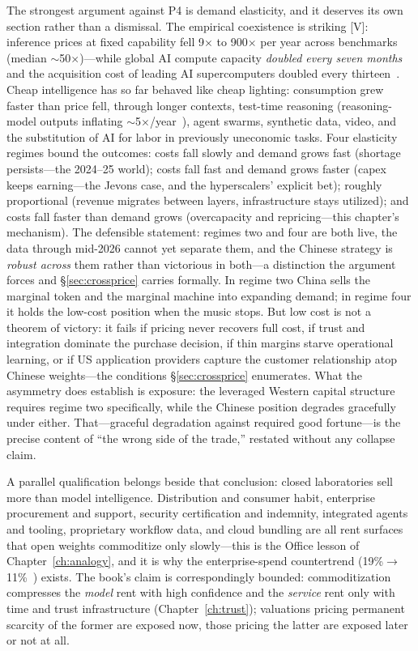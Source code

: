 The strongest argument against P4 is demand elasticity, and it deserves its own section rather than a dismissal. The empirical coexistence is striking [V]: inference prices at fixed capability fell 9$\times$ to 900$\times$ per year across benchmarks (median $\sim$50$\times$)---while global AI compute capacity \emph{doubled every seven months} and the acquisition cost of leading AI supercomputers doubled every thirteen~\cite{epoch-prices,epoch-capacity}. Cheap intelligence has so far behaved like cheap lighting: consumption grew faster than price fell, through longer contexts, test-time reasoning (reasoning-model outputs inflating $\sim$5$\times$/year~\cite{epoch-output}), agent swarms, synthetic data, video, and the substitution of AI for labor in previously uneconomic tasks. Four elasticity regimes bound the outcomes: costs fall slowly and demand grows fast (shortage persists---the 2024--25 world); costs fall fast and demand grows faster (capex keeps earning---the Jevons case, and the hyperscalers' explicit bet); roughly proportional (revenue migrates between layers, infrastructure stays utilized); and costs fall faster than demand grows (overcapacity and repricing---this chapter's mechanism). The defensible statement: regimes two and four are both live, the data through mid-2026 cannot yet separate them, and the Chinese strategy is \emph{robust across} them rather than victorious in both---a distinction the argument forces and \S\ref{sec:crossprice} carries formally. In regime two China sells the marginal token and the marginal machine into expanding demand; in regime four it holds the low-cost position when the music stops. But low cost is not a theorem of victory: it fails if pricing never recovers full cost, if trust and integration dominate the purchase decision, if thin margins starve operational learning, or if US application providers capture the customer relationship atop Chinese weights---the conditions \S\ref{sec:crossprice} enumerates. What the asymmetry does establish is exposure: the leveraged Western capital structure requires regime two specifically, while the Chinese position degrades gracefully under either. That---graceful degradation against required good fortune---is the precise content of ``the wrong side of the trade,'' restated without any collapse claim.

A parallel qualification belongs beside that conclusion: closed laboratories sell more than model intelligence. Distribution and consumer habit, enterprise procurement and support, security certification and indemnity, integrated agents and tooling, proprietary workflow data, and cloud bundling are all rent surfaces that open weights commoditize only slowly---this is the Office lesson of Chapter~\ref{ch:analogy}, and it is why the enterprise-spend countertrend (19\%$\rightarrow$11\%~\cite{menlo}) exists. The book's claim is correspondingly bounded: commoditization compresses the \emph{model} rent with high confidence and the \emph{service} rent only with time and trust infrastructure (Chapter~\ref{ch:trust}); valuations pricing permanent scarcity of the former are exposed now, those pricing the latter are exposed later or not at all.

